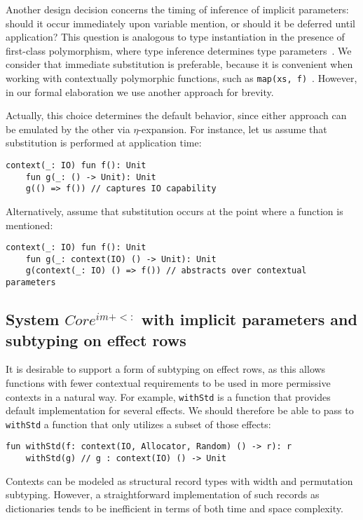 \documentclass[acmsmall,review,screen]{acmart}
\begin{document}
Another design decision concerns the timing of inference of implicit parameters: should it occur immediately upon variable mention, or should it be deferred until application?
This question is analogous to type instantiation in the presence of first-class polymorphism, where type inference determines type parameters~\cite{emrich2020freezeml}.
We consider that immediate substitution is preferable, because it is convenient when working with contextually polymorphic functions, such as \lstinline[language=colang]{map(xs, f)}~\cite{KEEP-context-parameters}.
However, in our formal elaboration we use another approach for brevity.

Actually, this choice determines the default behavior, since either approach can be emulated by the other via $\eta$-expansion.
For instance, let us assume that substitution is performed at application time:
\begin{lstlisting}[language=colang]
    context(_: IO) fun f(): Unit
    fun g(_: () -> Unit): Unit
    g(() => f()) // captures IO capability
\end{lstlisting}
Alternatively, assume that substitution occurs at the point where a function is mentioned:
\begin{lstlisting}[language=colang]
    context(_: IO) fun f(): Unit
    fun g(_: context(IO) () -> Unit): Unit
    g(context(_: IO) () => f()) // abstracts over contextual parameters
\end{lstlisting}

\subsection{System $Core^{im+<:}$ with implicit parameters and subtyping on effect rows} \label{subsec:im-sub}

It is desirable to support a form of subtyping on effect rows, as this allows functions with fewer contextual requirements to be used in more permissive contexts in a natural way.
For example, \lstinline[language=colang]{withStd} is a function that provides default implementation for several effects.
We should therefore be able to pass to \lstinline[language=colang]{withStd} a function that only utilizes a subset of those effects:
\begin{lstlisting}[language=colang]
    fun withStd(f: context(IO, Allocator, Random) () -> r): r
    withStd(g) // g : context(IO) () -> Unit
\end{lstlisting}

Contexts can be modeled as structural record types with width and permutation subtyping.
However, a straightforward implementation of such records as dictionaries tends to be inefficient in terms of both time and space complexity.
\end{document}
